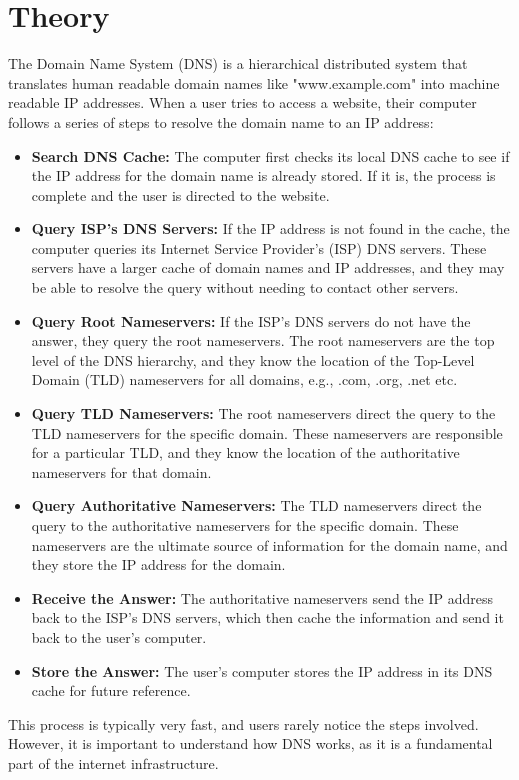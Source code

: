 \documentclass[11pt]{article}
\begin{document}
\section{Theory}
The Domain Name System (DNS) is a hierarchical distributed system that translates
human readable domain names like "www.example.com" into machine readable IP addresses.
When a user tries to access a website, their computer follows a series of steps to resolve
the domain name to an IP address:
\begin{itemize}
    \item \textbf{Search DNS Cache:} The computer first checks its local DNS cache to see if the IP address for
    the domain name is already stored. If it is, the process is complete and the user is directed to
    the website.
    \item \textbf{Query ISP's DNS Servers:} If the IP address is not found in the cache, the computer queries its
    Internet Service Provider's (ISP) DNS servers. These servers have a larger cache of domain names and 
    IP addresses, and they may be able to resolve the query without needing to contact other servers.
    \item \textbf{Query Root Nameservers:} If the ISP's DNS servers do not have the answer, they query the
    root nameservers. The root nameservers are the top level of the DNS hierarchy, and they know the location
    of the Top-Level Domain (TLD) nameservers for all domains, e.g., .com, .org, .net etc.
    \item \textbf{Query TLD Nameservers:} The root nameservers direct the query to the TLD nameservers
    for the specific domain. These nameservers are responsible for a particular TLD, and they know the
    location of the authoritative nameservers for that domain.
    \item \textbf{Query Authoritative Nameservers:} The TLD nameservers direct the query to the authoritative
    nameservers for the specific domain. These nameservers are the ultimate source of information for the domain
    name, and they store the IP address for the domain.
    \item \textbf{Receive the Answer:} The authoritative nameservers send the IP address back to the ISP's DNS
    servers, which then cache the information and send it back to the user's computer.
    \item \textbf{Store the Answer:} The user's computer stores the IP address in its DNS cache for future reference.
\end{itemize}
This process is typically very fast, and users rarely notice the steps involved. However, it is important to understand
how DNS works, as it is a fundamental part of the internet infrastructure.
\end{document}
